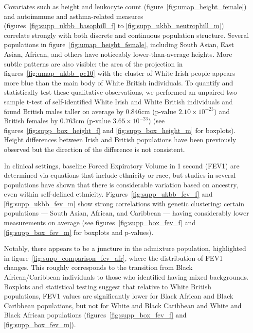 \documentclass[12pt]{pnas-new}
\begin{document}
Covariates such as height and leukocyte count (figure~\ref{fig:umap_height_female}) and autoimmune and asthma-related measures (figures~\ref{fig:supp_ukbb_basophill_f} to \ref{fig:supp_ukbb_neutrophill_m}) correlate strongly with both discrete and continuous population structure. Several populations in figure~\ref{fig:umap_height_female}, including South Asian, East Asian, African, and others have noticeably lower-than-average heights. More subtle patterns are also visible: the area of the projection in figures~\ref{fig:umap_ukbb_pc10} with the cluster of White Irish people appears more blue than the main body of White British individuals. To quantify and statistically test these qualitative observations, we performed an unpaired two sample t-test of self-identified White Irish and White British individuals and found British males taller on average by 0.846cm (p-value $2.10\times 10^{-23}$) and British females by 0.763cm (p-value $3.65\times 10^{-23}$) (see figures~\ref{fig:supp_box_height_f} and \ref{fig:supp_box_height_m} for boxplots). Height differences between Irish and British populations have been previously observed but the direction of the difference is not consistent\cite{robinson2015population,komlos1994stature}.

In clinical settings, baseline Forced Expiratory Volume in 1 second (FEV1) are determined via equations that include ethnicity or race\cite{quanjer2012multi}, but studies in several populations have shown that there is considerable variation based on ancestry, even within self-defined ethnicity\cite{ortega2015effect}. Figures~\ref{fig:supp_ukbb_fev_f} and \ref{fig:supp_ukbb_fev_m} show strong correlations with genetic clustering: certain populations --- South Asian, African, and Caribbean --- having considerably lower measurements on average (see figures~\ref{fig:supp_box_fev_f} and \ref{fig:supp_box_fev_m} for boxplots and p-values). 
 
 Notably, there appears to be a juncture in the admixture population, highlighted in figure~\ref{fig:supp_comparison_fev_afr}, where the distribution of FEV1 changes. This roughly corresponds to the transition from Black African/Caribbean individuals to those who identified having mixed backgrounds. Boxplots and statistical testing suggest that relative to White British populations, FEV1 values are significantly lower for Black African and Black Caribbean populations, but not for White and Black Caribbean and White and Black African populations (figures~\ref{fig:supp_box_fev_f} and \ref{fig:supp_box_fev_m}). 
\end{document}
